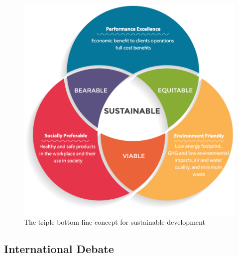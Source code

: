 \documentclass[11pt]{article}
\theoremstyle{definition}
\begin{document}
\begin{figure}[H]
	\centering
	\includegraphics[width=0.5\linewidth]{img/triple_bottom_line.png}
	\caption{The triple bottom line concept for sustainable development}
\end{figure}

\clearpage
\subsection{International Debate}
\end{document}
